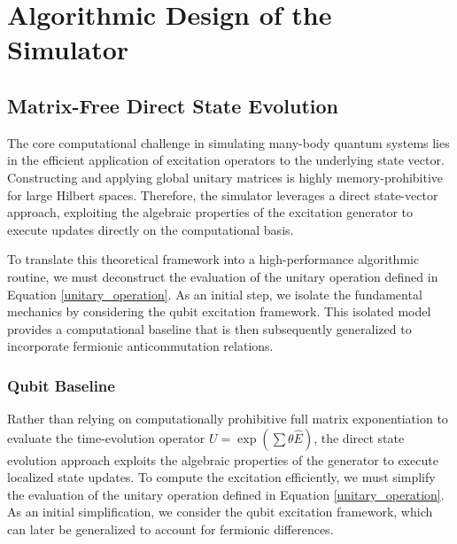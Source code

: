 \chapter{Algorithmic Design of the Simulator}
\label{c:algorithmic}


\section{Matrix-Free Direct State Evolution}\label{sec:matrix-free-direct-state-evolution}
The core computational challenge in simulating many-body quantum systems lies in the efficient application of excitation operators to the underlying state vector. Constructing and applying global unitary matrices is highly memory-prohibitive for large Hilbert spaces. Therefore, the simulator leverages a direct state-vector approach, exploiting the algebraic properties of the excitation generator to execute updates directly on the computational basis.

To translate this theoretical framework into a high-performance algorithmic routine, we must deconstruct the evaluation of the unitary operation defined in Equation \eqref{unitary_operation}. As an initial step, we isolate the fundamental mechanics by considering the qubit excitation framework. This isolated model provides a computational baseline that is then subsequently generalized to incorporate fermionic anticommutation relations.

\subsection{Qubit Baseline}\label{subsec:qubit-baseline}
Rather than relying on computationally prohibitive full matrix exponentiation to evaluate the time-evolution operator $U = \exp(\sum \theta \hat{E})$, the direct state evolution approach exploits the algebraic properties of the generator to execute localized state updates. To compute the excitation efficiently, we must simplify the evaluation of the unitary operation defined in Equation \eqref{unitary_operation}. As an initial simplification, we consider the qubit excitation framework, which can later be generalized to account for fermionic differences. 

